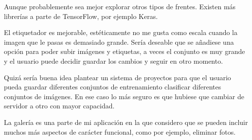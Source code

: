Aunque probablemente sea mejor explorar otros tipos de frentes. Existen más librerías a parte de TensorFlow, por ejemplo Keras.

El etiquetador es mejorable, estéticamente no me gusta como escala cuando la imagen que le pasas es demasiado grande.
Sería deseable que se añadiese una opción para poder subir imágenes y etiquetas, a veces el conjunto es muy grande y el usuario puede decidir guardar los cambios y seguir en otro momento.

Quizá sería buena idea plantear un sistema de proyectos para que el usuario pueda guardar diferentes conjuntos de entrenamiento clasificar diferentes conjuntos de imágenes. En ese caso lo más seguro es que hubiese que cambiar de servidor a otro con mayor capacidad.

La galería es una parte de mi aplicación en la que considero que se pueden incluir muchos más aspectos de carácter funcional, como por ejemplo, eliminar fotos.

